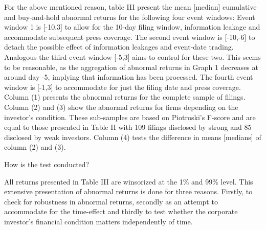 \documentclass[12pt]{article}
\begin{document}
For the above mentioned reason, table III present the mean [median] cumulative and buy-and-hold abnormal returns for the following four event windows: Event window 1 is [-10,3] to allow for the 10-day filing window, information leakage and accommodate subsequent press coverage. The second event window is [-10,-6] to detach the possible effect of information leakages and event-date trading. Analogous the third event window [-5,3] aims to control for these two. This seems to be reasonable, as the aggregation of abnormal returns in Graph 1 decreases at around day -5, implying that information has been processed. The fourth event window is [-1,3] to accommodate for just the filing date and press coverage. \\
Column (1) presents the abnormal returns for the complete sample of filings. Column (2) and (3) show the abnormal returns for firms depending on the investor's condition. These sub-samples are based on Piotroski's F-score and are equal to those presented in Table II with 109 filings disclosed by strong and 85 disclosed by weak investors. Column (4) tests the difference in means [medians] of column (2) and (3).
\begin{center}
	How is the test conducted? 
\end{center}
All returns  presented in Table III are winsorized at the 1\% and 99\% level. This extensive presentation of abnormal returns is done for three reasons. Firstly, to check for robustness in abnormal returns, secondly as an attempt to accommodate for the time-effect and thirdly to test whether the corporate investor's financial condition matters independently of time. 

\end{document}
